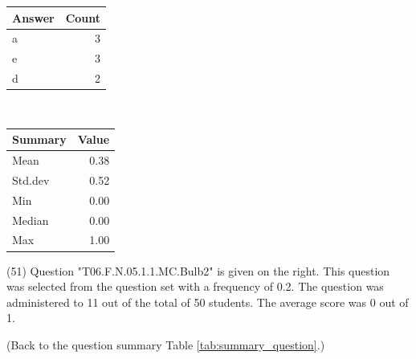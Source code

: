 \documentclass[12pt,english,nohyper]{tufte-handout}\usepackage[]{graphicx}\usepackage[]{color}
\begin{document}
\begin{center}%
\begin{tabular}{lr}
  \hline
Answer & Count \\ 
  \hline
a &   3 \\ 
  e &   3 \\ 
  d &   2 \\ 
   \hline
\end{tabular}
~~~~~~~~%
\begin{tabular}{lr}
  \hline
Summary & Value \\ 
  \hline
Mean & 0.38 \\ 
  Std.dev & 0.52 \\ 
  Min & 0.00 \\ 
  Median & 0.00 \\ 
  Max & 1.00 \\ 
   \hline
\end{tabular}
\end{center}\newpage{} (51) Question "T06.F.N.05.1.1.MC.Bulb2" is given on the right. This question was selected from the question set with a frequency of 0.2. The question was administered to 11 out of the total of 50 students. The average score was 0 out of 1.

 (Back to the question summary Table \ref{tab:summary_question}.)
\end{document}
